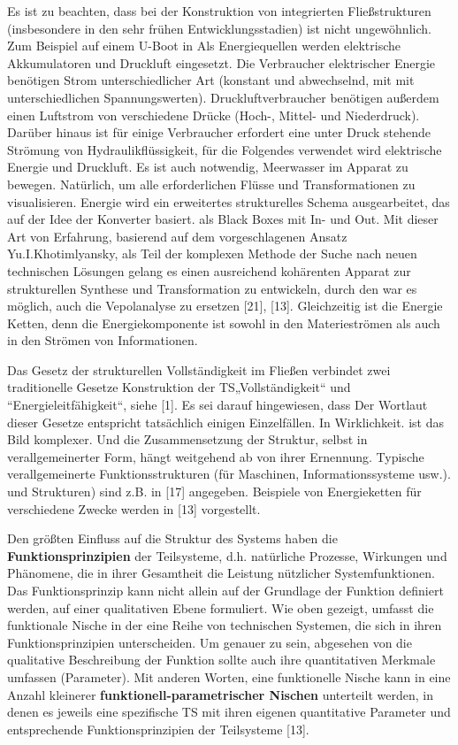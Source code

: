 \documentclass[11pt,a4paper]{article}
\begin{document}
\begin{emph}
  Es ist zu beachten, dass bei der Konstruktion von integrierten
  Fließstrukturen (insbesondere in den sehr frühen Entwicklungsstadien) ist
  nicht ungewöhnlich. Zum Beispiel auf einem U-Boot in Als Energiequellen
  werden elektrische Akkumulatoren und Druckluft eingesetzt.  Die Verbraucher
  elektrischer Energie benötigen Strom unterschiedlicher Art (konstant und
  abwechselnd, mit mit unterschiedlichen Spannungswerten).
  Druckluftverbraucher benötigen außerdem einen Luftstrom von verschiedene
  Drücke (Hoch-, Mittel- und Niederdruck). Darüber hinaus ist für einige
  Verbraucher erfordert eine unter Druck stehende Strömung von
  Hydraulikflüssigkeit, für die Folgendes verwendet wird elektrische Energie
  und Druckluft. Es ist auch notwendig, Meerwasser im Apparat zu bewegen.
  Natürlich, um alle erforderlichen Flüsse und Transformationen zu
  visualisieren.  Energie wird ein erweitertes strukturelles Schema
  ausgearbeitet, das auf der Idee der Konverter basiert.  als Black Boxes mit
  In- und Out. Mit dieser Art von Erfahrung, basierend auf dem vorgeschlagenen
  Ansatz Yu.I.Khotimlyansky, als Teil der komplexen Methode der Suche nach
  neuen technischen Lösungen gelang es einen ausreichend kohärenten Apparat
  zur strukturellen Synthese und Transformation zu entwickeln, durch den war
  es möglich, auch die Vepolanalyse zu ersetzen [21], [13]. Gleichzeitig ist
  die Energie Ketten, denn die Energiekomponente ist sowohl in den
  Materieströmen als auch in den Strömen von Informationen.
\end{emph}

Das Gesetz der strukturellen Vollständigkeit im Fließen verbindet zwei
traditionelle Gesetze Konstruktion der TS„Vollständigkeit“ und
“Energieleitfähigkeit“, siehe [1]. Es sei darauf hingewiesen, dass Der
Wortlaut dieser Gesetze entspricht tatsächlich einigen Einzelfällen. In
Wirklichkeit.  ist das Bild komplexer. Und die Zusammensetzung der Struktur,
selbst in verallgemeinerter Form, hängt weitgehend ab von ihrer
Ernennung. Typische verallgemeinerte Funktionsstrukturen (für Maschinen,
Informationssysteme usw.).  und Strukturen) sind z.B. in [17]
angegeben. Beispiele von Energieketten für verschiedene Zwecke werden in [13]
vorgestellt.

Den größten Einfluss auf die Struktur des Systems haben die
\textbf{Funktionsprinzipien} der Teilsysteme, d.h.  natürliche Prozesse,
Wirkungen und Phänomene, die in ihrer Gesamtheit die Leistung nützlicher
Systemfunktionen. Das Funktionsprinzip kann nicht allein auf der Grundlage der
Funktion definiert werden, auf einer qualitativen Ebene formuliert. Wie oben
gezeigt, umfasst die funktionale Nische in der eine Reihe von technischen
Systemen, die sich in ihren Funktionsprinzipien unterscheiden. Um genauer zu
sein, abgesehen von die qualitative Beschreibung der Funktion sollte auch ihre
quantitativen Merkmale umfassen (Parameter). Mit anderen Worten, eine
funktionelle Nische kann in eine Anzahl kleinerer
\textbf{funktionell-parametrischer Nischen} unterteilt werden, in denen es
jeweils eine spezifische TS mit ihren eigenen quantitative Parameter und
entsprechende Funktionsprinzipien der Teilsysteme [13].
\end{document}
